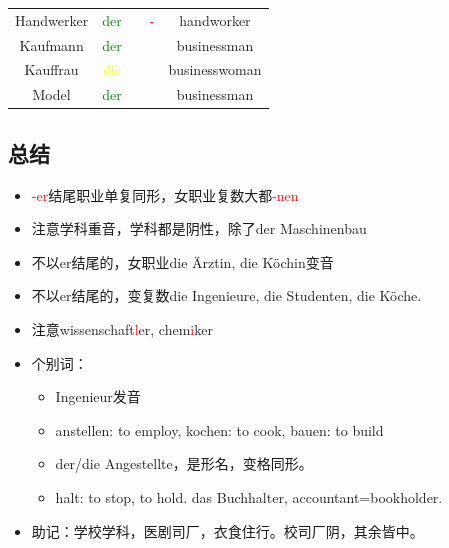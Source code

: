 \begin{center}
\begin{longtable} {|c|c|c|c|c|}
        Handwerker                      & \textcolor{green}{der}                         &                       & \textcolor{red}{-}                       & handworker              \\
        Kaufmann                        & \textcolor{green}{der}                         &                       &                                          & businessman             \\
        Kauffrau                        & \textcolor{yellow}{die}                        &                       &                                          & businesswoman           \\
        Model                           & \textcolor{green}{der}                         &                       &                                          & businessman             \\
    \end{longtable}
\end{center}

\subsection{总结}
\begin{itemize}
    \item \textcolor{red}{-er}结尾职业单复同形，女职业复数大都\textcolor{red}{-nen}
    \item 注意学科重音，学科都是阴性，除了der Maschinenbau
    \item 不以er结尾的，女职业die Ärztin, die Köchin变音
    \item 不以er结尾的，变复数die Ingenieure, die Studenten, die Köche.
    \item 注意wissenschaft\textcolor{red}{l}er, chem\textcolor{red}{i}ker
    \item 个别词：
          \begin{itemize}
              \item Ingenieur发音 
              \item anstellen: to employ, kochen: to cook, bauen: to build
              \item der/die Angestellte，是形名，变格同形。
              \item halt: to stop, to hold. das Buchhalter, accountant=bookholder.
          \end{itemize}
    \item 助记：学校学科，医剧司厂，衣食住行。校司厂阴，其余皆中。
\end{itemize}

